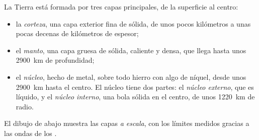 \begin{definition}\label{def:g6:inside-the-earth:layers}
La Tierra está formada por tres capas principales, de la superficie al
centro:
\begin{itemize}
  \item la \emph{corteza}, una capa exterior fina de 
        sólida, de unos pocos kilómetros a unas pocas decenas de kilómetros
        de espesor;
  \item el \emph{manto}, una capa gruesa de  sólida,
        caliente y densa, que llega hasta unos 2900~km de profundidad;
  \item el \emph{núcleo}, hecho de metal, sobre todo
        hierro con algo de níquel, desde unos 2900~km hasta el centro. El
        núcleo tiene dos partes: el \emph{núcleo
        externo}, que es líquido, y el
        \emph{núcleo interno}, una bola
        sólida en el centro, de unos 1220~km de radio.
\end{itemize}
\end{definition}

El dibujo de abajo muestra las capas \emph{a escala}, con los límites
medidos gracias a las ondas de los .

